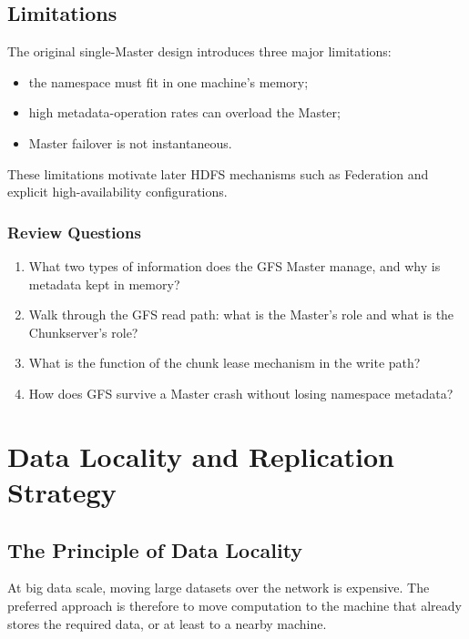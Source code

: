 \documentclass[11pt,a4paper,oneside]{book}
\begin{document}
\subsection{Limitations}

The original single-Master design introduces three major limitations:

\begin{itemize}
    \item the namespace must fit in one machine's memory;
    \item high metadata-operation rates can overload the Master;
    \item Master failover is not instantaneous.
\end{itemize}

These limitations motivate later HDFS mechanisms such as Federation and explicit high-availability configurations.

\subsubsection*{Review Questions}
\begin{enumerate}
    \item What two types of information does the GFS Master manage, and why is metadata kept in memory?
    \item Walk through the GFS read path: what is the Master's role and what is the Chunkserver's role?
    \item What is the function of the chunk lease mechanism in the write path?
    \item How does GFS survive a Master crash without losing namespace metadata?
\end{enumerate}


\section{Data Locality and Replication Strategy}

\subsection{The Principle of Data Locality}

At big data scale, moving large datasets over the network is expensive. The preferred approach is therefore to move computation to the machine that already stores the required data, or at least to a nearby machine.
\end{document}
